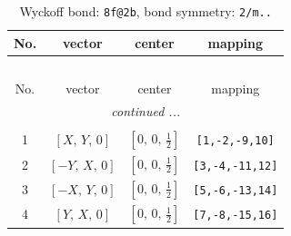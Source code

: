 \documentclass[fleqn,8pt]{jsarticle}
\begin{document}
\renewcommand{\arraystretch}{1.2}
\begin{longtable}{cccc}
\caption{Wyckoff bond: {\tt 8f@2b}, bond symmetry: {\tt 2/m..}}
 \\
 \hline \hline
No. & vector & center & mapping \\ \hline \endfirsthead

\multicolumn{3}{l}{\tablename\ \thetable{}} \\
 \hline \hline
No. & vector & center & mapping \\ \hline \endhead

 \hline \hline
\multicolumn{3}{r}{\footnotesize\it continued ...} \\ \endfoot

 \hline \hline
\multicolumn{3}{r}{} \\ \endlastfoot

1 & $\left[ X,\, Y,\, 0 \right]$ & $\left[ 0,\, 0,\, \frac{1}{2} \right]$ & {\tt [1,-2,-9,10]} \\ \hline
2 & $\left[ - Y,\, X,\, 0 \right]$ & $\left[ 0,\, 0,\, \frac{1}{2} \right]$ & {\tt [3,-4,-11,12]} \\ \hline
3 & $\left[ - X,\, Y,\, 0 \right]$ & $\left[ 0,\, 0,\, \frac{1}{2} \right]$ & {\tt [5,-6,-13,14]} \\ \hline
4 & $\left[ Y,\, X,\, 0 \right]$ & $\left[ 0,\, 0,\, \frac{1}{2} \right]$ & {\tt [7,-8,-15,16]} \\
\end{longtable}
\renewcommand{\arraystretch}{1.2}
\end{document}
